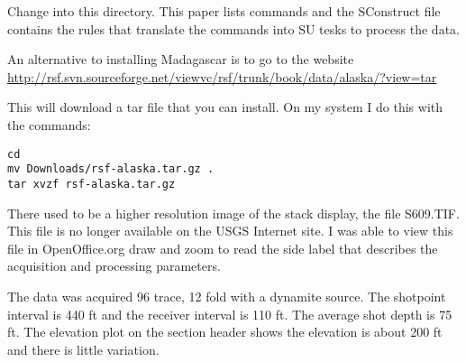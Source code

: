 Change into this directory.  This paper lists commands and the SConstruct 
file contains the rules that translate the commands into SU tesks 
to process the data.

An alternative to installing Madagascar is to go to the website \url{http://rsf.svn.sourceforge.net/viewvc/rsf/trunk/book/data/alaska/?view=tar}

This will download a tar file that you can install.  On my system I
do this with the commands:
\begin{verbatim}
cd
mv Downloads/rsf-alaska.tar.gz .
tar xvzf rsf-alaska.tar.gz
\end{verbatim}

\begin{comment}
This will untar the directory.  When it completes, continue:\\
cd open\_lib\_demo\_2011\\
cat readme

This will tell you about the files you downloaded.  You can look at the 
su commands the process will use by typing:\\
cat doit.job

Then you can run the processing by typing:\\  
./doit.job

You can also run the individual tasks with the scripts in the tar file. 
For example, to view the previous final stack, the text says run:\\
scons prevstack.view \\

You can run the script from the tar file:\\
./prevstack.job

The scons will download the file 31\_81\_IM.JPG from the Internet and 
display it using open office draw (oodraw).  The tar file supplies the 
files so the scripts skip the download.  ./prevstack.job just displays
the file using oodraw.
\end{comment}

There used to be a higher resolution image of the stack display, the 
file S609.TIF.  This file is no longer available on the USGS Internet 
site.  I was able to view this file in OpenOffice.org draw 
and zoom to read the side label that describes the acquisition and 
processing parameters.

The data was acquired 96 trace, 12 fold with a dynamite source.  The
shotpoint interval is 440 ft and the receiver interval is 110 ft.  The
average shot depth is 75 ft.  The elevation plot on the section header
shows the elevation is about 200 ft and there is little variation.

